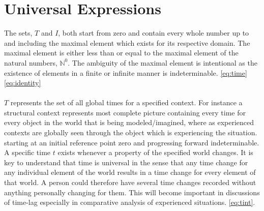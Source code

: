 \documentclass[]{article}
\begin{document}
\section*{Universal Expressions}
The sets, $T$ and $I$, both start from zero and contain every whole number up to and including the maximal element which exists for its respective domain. The maximal element is either less than or equal to the maximal element of the natural numbers, $\mathbb{N}^{0}$. The ambiguity of the maximal element is intentional as the existence of elements in a finite or infinite manner is indeterminable. \eqref{eq:time} \eqref{eq:identity}
\\
\\
%
$T$ represents the set of all global times for a specified context. For instance a structural context represents most complete picture containing every time for every object in the world that is being modeled/imagined, where as experienced contexts are globally seen through the object which is experiencing the situation. starting at an initial reference point zero and progressing forward indeterminable. A specific time $t$ exists whenever a property of the specified world changes. It is key to understand that time is universal in the sense that any time change for any individual element of the world results in a time change for every element of that world. A person could therefore have several time changes recorded without anything personally changing for them. This will become important in discussions of time-lag especially in comparative analysis of experienced situations. \eqref{eq:tint}. 
\\
\\ 
\end{document}
